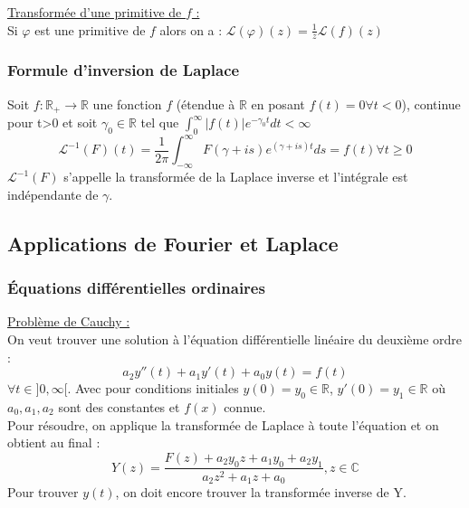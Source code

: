 \documentclass[../main.tex]{subfiles}
\begin{document}
\quad \underline{Transformée d'une primitive de $f$ :}\\
Si $\varphi$ est une primitive de $f$ alors on a : $\mathcal{L}(\varphi)(z) = \frac{1}{z}\mathcal{L}(f)(z)$\\

\subsubsection{Formule d'inversion de Laplace}
Soit $f:\mathbb{R}_+ \rightarrow\mathbb{R}$ une fonction $f$ (étendue à $\mathbb{R}$ en posant $f(t)=0 \forall t<0$), continue pour t>0 et soit $\gamma_0\in \mathbb{R}$ tel que $\int_0^{\infty}|f(t)|e^{-\gamma_0 t}dt<\infty$\\
\begin{equation}
    \mathcal{L}^{-1}(F)(t) = \frac{1}{2\pi} \int_{-\infty}^{\infty}F(\gamma+is)e^{(\gamma+is)t}ds = f(t) \forall t \geq 0
\end{equation}
$\mathcal{L}^{-1}(F)$ s'appelle la transformée de la Laplace inverse et l'intégrale est indépendante de $\gamma$.\\

\subsection{Applications de Fourier et Laplace}
\subsubsection{Équations différentielles ordinaires}
\quad \underline{Problème de Cauchy :}\\
On veut trouver une solution à l'équation différentielle linéaire du deuxième ordre :\\
\begin{equation}
    a_2y''(t) + a_1 y'(t) + a_0 y(t) = f(t)
\end{equation}
$\forall t\in]0,\infty[$. Avec pour conditions initiales $y(0) = y_0 \in \mathbb{R}$, $y'(0) = y_1 \in \mathbb{R}$ où $a_0,a_1,a_2$ sont des constantes et $f(x)$ connue.\\

Pour résoudre, on applique la transformée de Laplace à toute l'équation et on obtient au final : \\
\begin{equation}
    Y(z) = \frac{F(z) + a_2 y_0z + a_1 y_0 + a_2 y_1}{a_2z^2+a_1z+a_0}, z\in \mathbb{C}
\end{equation}
Pour trouver $y(t)$, on doit encore trouver la transformée inverse de Y.\\
\end{document}
